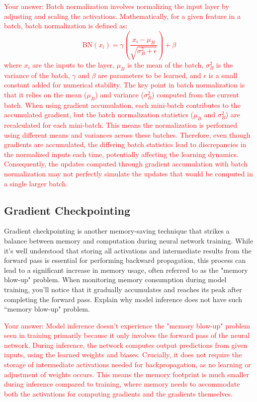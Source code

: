 \textcolor{red}{
Your answer: Batch normalization involves normalizing the input layer by adjusting and scaling the activations. Mathematically, for a given feature in a batch, batch normalization is defined as:
\[
\text{BN}(x_i) = \gamma \left(\frac{x_i - \mu_B}{\sqrt{\sigma_B^2 + \epsilon}}\right) + \beta
\]
where \( x_i \) are the inputs to the layer, \( \mu_B \) is the mean of the batch, \( \sigma_B^2 \) is the variance of the batch, \( \gamma \) and \( \beta \) are parameters to be learned, and \( \epsilon \) is a small constant added for numerical stability.
\newline
The key point in batch normalization is that it relies on the mean (\( \mu_B \)) and variance (\( \sigma_B^2 \)) computed from the current batch. When using gradient accumulation, each mini-batch contributes to the accumulated gradient, but the batch normalization statistics (\( \mu_B \) and \( \sigma_B^2 \)) are recalculated for each mini-batch. This means the normalization is performed using different means and variances across these batches.
Therefore, even though gradients are accumulated, the differing batch statistics lead to discrepancies in the normalized inputs each time, potentially affecting the learning dynamics. Consequently, the updates computed through gradient accumulation with batch normalization may not perfectly simulate the updates that would be computed in a single larger batch.
}

\subsection{Gradient Checkpointing}

Gradient checkpointing is another memory-saving technique that strikes a balance between memory and computation during neural network training. While it's well understood that storing all activations and intermediate results from the forward pass is essential for performing backward propagation, this process can lead to a significant increase in memory usage, often referred to as the "memory blow-up" problem. When monitoring memory consumption during model training, you'll notice that it gradually accumulates and reaches its peak after completing the forward pass. Explain why model inference does not have such ``memory blow-up" problem.

\textcolor{red}{
Your answer: Model inference doesn't experience the "memory blow-up" problem seen in training primarily because it only involves the forward pass of the neural network. During inference, the network computes output predictions from given inputs, using the learned weights and biases. Crucially, it does not require the storage of intermediate activations needed for backpropagation, as no learning or adjustment of weights occurs. This means the memory footprint is much smaller during inference compared to training, where memory needs to accommodate both the activations for computing gradients and the gradients themselves.
}

